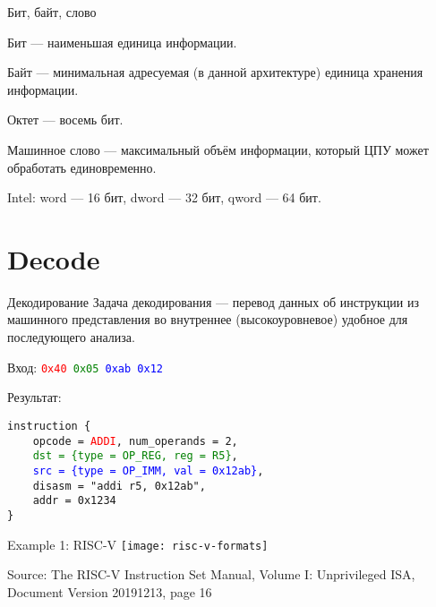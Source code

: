 \begin{frame}{Бит, байт, слово}

Бит \pause --- наименьшая единица информации.

\pause\bigskip

Байт \pause --- минимальная адресуемая (в данной архитектуре) единица хранения
информации.

\pause\bigskip

Октет --- восемь бит.

\pause\bigskip

Машинное слово \pause --- максимальный объём информации, который ЦПУ может
обработать единовременно.

\pause\bigskip

Intel: word — 16 бит, dword — 32 бит, qword — 64 бит.

\end{frame}

\section{Decode}

\begin{frame}{Декодирование}
Задача декодирования --- перевод данных об инструкции из машинного представления
во внутреннее (высокоуровневое) удобное для последующего анализа.

\pause

Вход: \texttt{\textcolor{red}{0x40} \textcolor{green}{0x05} \textcolor{blue}{0xab 0x12}}

Результат:

\texttt{instruction \{ \\
~~~~opcode = \textcolor{red}{ADDI}, num\_operands = 2, \\
~~~~\textcolor{green}{dst = \{type = OP\_REG, reg = R5\}}, \\
~~~~\textcolor{blue}{src = \{type = OP\_IMM, val = 0x12ab\}}, \\
~~~~disasm = "addi r5, 0x12ab", \\
~~~~addr = 0x1234 \\
\}}
\end{frame}

\begin{frame}{Example 1: RISC-V}
\centering
\texttt{[image: risc-v-formats]}

\tiny{Source: The RISC-V Instruction Set Manual, Volume I: Unprivileged ISA,
      Document Version 20191213, page 16}
\end{frame}

